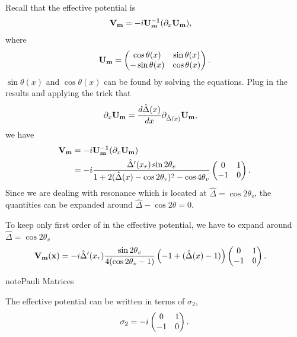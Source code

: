 \documentclass[letterpaper,12pt,english]{sphinxmanual}
\begin{document}
Recall that the effective potential is
\begin{gather}
\begin{split}\mathbf{V_m} & = -i\mathbf{U_m^{-1}} ( \partial_x \mathbf{U_m} ) ,\end{split}\notag
\end{gather}
where
\begin{gather}
\begin{split}\mathbf{U_m} = \begin{pmatrix} \cos \theta(x) & \sin\theta(x) \\ -\sin\theta(x) & \cos\theta(x) \end{pmatrix} .\end{split}\notag
\end{gather}
\(\sin\theta(x)\) and \(\cos\theta(x)\) can be found by solving the equations. Plug in the results and applying the trick that
\begin{gather}
\begin{split}\partial_x \mathbf{U_m} & = \frac{d \hat\Delta(x)}{dx} \partial_{ \hat\Delta(x)} \mathbf{U_m} ,\end{split}\notag
\end{gather}
we have
\begin{gather}
\begin{split}\mathbf{V_m} & = -i\mathbf{U_m^{-1}} ( \partial_x \mathbf{U_m} ) \\
& = - i \frac{\hat\Delta'(x_r) \sin 2\theta_v}{ 1 + 2 (\hat\Delta(x)-\cos 2\theta_v)^2 - \cos 4\theta_v }   \begin{pmatrix}
0 & 1 \\
-1 & 0
\end{pmatrix} .\end{split}\notag
\end{gather}
Since we are dealing with resonance which is located at \(\hat\Delta =\cos 2\theta_v\), the quantities can be expanded around \(\hat\Delta - \cos 2\theta = 0\).

To keep only first order of in the effective potential, we have to expand around \(\hat\Delta = \cos 2\theta_v\)
\begin{gather}
\begin{split}\mathbf{V_m(x)} & = - i \hat\Delta'(x_r) \frac{\sin 2\theta_v}{4(\cos 2\theta_v -1)} \left( -1 + (\hat\Delta(x) - 1)  \right)  \begin{pmatrix}
0 & 1 \\
-1 & 0
\end{pmatrix}.\end{split}\notag
\end{gather}
\begin{notice}{note}{Pauli Matrices}

The effective potential can be written in terms of \(\sigma_2\),
\begin{gather}
\begin{split}\sigma_2 = - i  \begin{pmatrix}
0 & 1 \\
-1 & 0
\end{pmatrix}.\end{split}\notag
\end{gather}\end{notice}
\end{document}
